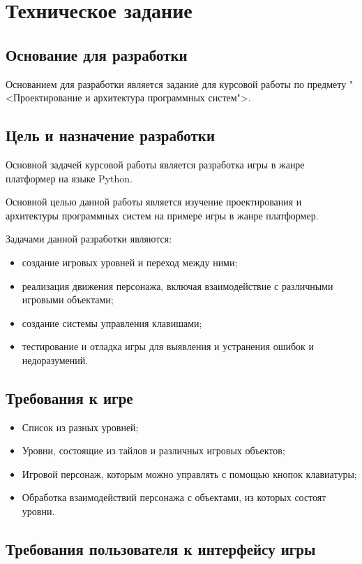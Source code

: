 \section{Техническое задание}
\subsection{Основание для разработки}

Основанием для разработки является задание для курсовой работы по предмету   "<Проектирование и архитектура программных систем">.

\subsection{Цель и назначение разработки}

Основной задачей курсовой работы является разработка игры в жанре платформер на языке Python.

Основной целью данной работы является изучение проектирования и архитектуры программных систем на примере игры в жанре платформер.

Задачами данной разработки являются:
\begin{itemize}
\item создание игровых уровней и переход между ними;
\item реализация движения персонажа, включая взаимодействие с различными игровыми объектами;
\item создание системы управления клавишами;
\item тестирование и отладка игры для выявления и устранения ошибок и недоразумений.
\end{itemize}

\subsection{Требования к игре}
\begin{itemize}
\item Список из разных уровней;
\item Уровни, состоящие из тайлов и  различных игровых объектов;
\item Игровой персонаж, которым можно управлять с помощью кнопок клавиатуры;
\item Обработка взаимодействий персонажа с объектами, из которых состоят  уровни.
\end{itemize}

\subsection{Требования пользователя к интерфейсу игры}

